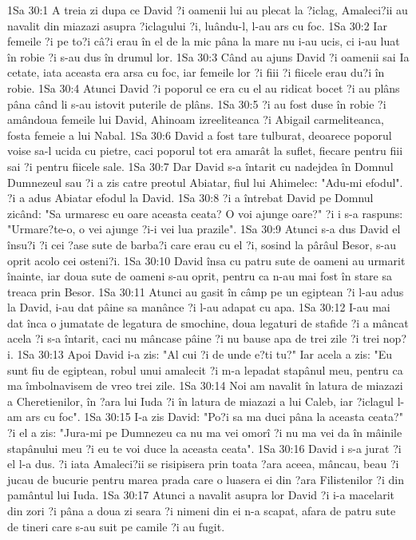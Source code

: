 1Sa 30:1  A treia zi dupa ce David ?i oamenii lui au plecat la ?iclag, Amaleci?ii au navalit din miazazi asupra ?iclagului ?i, luându-l, l-au ars cu foc.
1Sa 30:2  Iar femeile ?i pe to?i câ?i erau în el de la mic pâna la mare nu i-au ucis, ci i-au luat în robie ?i s-au dus în drumul lor.
1Sa 30:3  Când au ajuns David ?i oamenii sai Ia cetate, iata aceasta era arsa cu foc, iar femeile lor ?i fiii ?i fiicele erau du?i în robie.
1Sa 30:4  Atunci David ?i poporul ce era cu el au ridicat bocet ?i au plâns pâna când li s-au istovit puterile de plâns.
1Sa 30:5  ?i au fost duse în robie ?i amândoua femeile lui David, Ahinoam izreeliteanca ?i Abigail carmeliteanca, fosta femeie a lui Nabal.
1Sa 30:6  David a fost tare tulburat, deoarece poporul voise sa-l ucida cu pietre, caci poporul tot era amarât la suflet, fiecare pentru fiii sai ?i pentru fiicele sale.
1Sa 30:7  Dar David s-a întarit cu nadejdea în Domnul Dumnezeul sau ?i a zis catre preotul Abiatar, fiul lui Ahimelec: "Adu-mi efodul". ?i a adus Abiatar efodul la David.
1Sa 30:8  ?i a întrebat David pe Domnul zicând: "Sa urmaresc eu oare aceasta ceata? O voi ajunge oare?" ?i i s-a raspuns: "Urmare?te-o, o vei ajunge ?i-i vei lua prazile".
1Sa 30:9  Atunci s-a dus David el însu?i ?i cei ?ase sute de barba?i care erau cu el ?i, sosind la pârâul Besor, s-au oprit acolo cei osteni?i.
1Sa 30:10  David însa cu patru sute de oameni au urmarit înainte, iar doua sute de oameni s-au oprit, pentru ca n-au mai fost în stare sa treaca prin Besor.
1Sa 30:11  Atunci au gasit în câmp pe un egiptean ?i l-au adus la David, i-au dat pâine sa manânce ?i l-au adapat cu apa.
1Sa 30:12  I-au mai dat înca o jumatate de legatura de smochine, doua legaturi de stafide ?i a mâncat acela ?i s-a întarit, caci nu mâncase pâine ?i nu bause apa de trei zile ?i trei nop?i.
1Sa 30:13  Apoi David i-a zis: "Al cui ?i de unde e?ti tu?" Iar acela a zis: "Eu sunt fiu de egiptean, robul unui amalecit ?i m-a lepadat stapânul meu, pentru ca ma îmbolnavisem de vreo trei zile.
1Sa 30:14  Noi am navalit în latura de miazazi a Cheretienilor, în ?ara lui Iuda ?i în latura de miazazi a lui Caleb, iar ?iclagul l-am ars cu foc".
1Sa 30:15  I-a zis David: "Po?i sa ma duci pâna la aceasta ceata?" ?i el a zis: "Jura-mi pe Dumnezeu ca nu ma vei omorî ?i nu ma vei da în mâinile stapânului meu ?i eu te voi duce la aceasta ceata".
1Sa 30:16  David i s-a jurat ?i el l-a dus. ?i iata Amaleci?ii se risipisera prin toata ?ara aceea, mâncau, beau ?i jucau de bucurie pentru marea prada care o luasera ei din ?ara Filistenilor ?i din pamântul lui Iuda.
1Sa 30:17  Atunci a navalit asupra lor David ?i i-a macelarit din zori ?i pâna a doua zi seara ?i nimeni din ei n-a scapat, afara de patru sute de tineri care s-au suit pe camile ?i au fugit.
